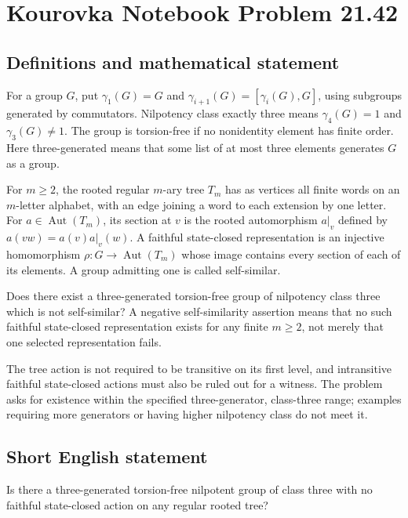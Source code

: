 \documentclass[11pt,a4paper]{article}
\begin{document}
\section*{Kourovka Notebook Problem 21.42}\label{statement}

\subsection{Definitions and mathematical statement}
For a group $G$, put $\gamma_1(G)=G$ and
$\gamma_{i+1}(G)=[\gamma_i(G),G]$, using subgroups generated by
commutators. Nilpotency class exactly three means
$\gamma_4(G)=1$ and $\gamma_3(G)\ne1$.
The group is torsion-free if no nonidentity element has finite order.
Here three-generated means that some list of at most three elements
generates $G$ as a group.

For $m\ge2$, the rooted regular $m$-ary tree $T_m$ has as vertices
all finite words on an $m$-letter alphabet, with an edge joining a word
to each extension by one letter. For $a\in\operatorname{Aut}(T_m)$,
its section at $v$ is the rooted automorphism $a|_v$ defined by
$a(vw)=a(v)a|_v(w)$.
A faithful state-closed representation is an injective homomorphism
$\rho:G\to\operatorname{Aut}(T_m)$ whose image contains every section
of each of its elements. A group admitting one is called self-similar.

Does there exist a three-generated torsion-free group of nilpotency
class three which is not self-similar? A negative self-similarity
assertion means that no such faithful state-closed representation exists
for any finite $m\ge2$, not merely that one selected representation fails.

The tree action is not required to be transitive on its first level,
and intransitive faithful state-closed actions must also be ruled out
for a witness. The problem asks for existence within the specified
three-generator, class-three range; examples requiring more generators
or having higher nilpotency class do not meet it.
\subsection{Short English statement}
Is there a three-generated torsion-free nilpotent group of class three with no faithful state-closed action on any regular rooted tree?
\end{document}
